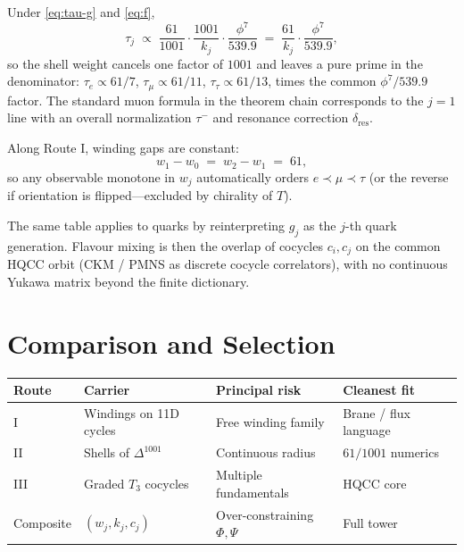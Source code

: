 \begin{corollary}
Under \eqref{eq:tau-g} and \eqref{eq:f},
\begin{equation}
\label{eq:tau-explicit}
\tau_j \;\propto\; \frac{61}{1001}\cdot\frac{1001}{k_j}\cdot\frac{\phi^7}{539.9}
\;=\; \frac{61}{k_j}\cdot\frac{\phi^7}{539.9},
\end{equation}
so the shell weight cancels one factor of \(1001\) and leaves a pure prime in the
denominator: \(\tau_e\propto 61/7\), \(\tau_\mu\propto 61/11\),
\(\tau_\tau\propto 61/13\), times the common \(\phi^7/539.9\) factor. The standard
muon formula in the theorem chain corresponds to the \(j=1\) line with an overall
normalization \(\tau^-\) and resonance correction \(\delta_{\mathrm{res}}\).
\end{corollary}

\begin{corollary}
Along Route I, winding gaps are constant:
\[
w_1-w_0 \;=\; w_2-w_1 \;=\; 61,
\]
so any observable monotone in \(w_j\) automatically orders
\(e\prec\mu\prec\tau\) (or the reverse if orientation is flipped---excluded by
chirality of \(T\)).
\end{corollary}

\begin{remark}
The same table applies to quarks by reinterpreting \(g_j\) as the \(j\)-th quark
generation. Flavour mixing is then the overlap of cocycles \(c_i,c_j\) on the
common HQCC orbit (CKM / PMNS as discrete cocycle correlators), with no
continuous Yukawa matrix beyond the finite dictionary.
\end{remark}

\section{Comparison and Selection}
\label{sec:compare}

\begin{center}
\begin{tabular}{@{}llll@{}}
\toprule
Route & Carrier & Principal risk & Cleanest fit \\
\midrule
I & Windings on 11D cycles & Free winding family & Brane / flux language \\
II & Shells of \(\Delta^{1001}\) & Continuous radius & \(61/1001\) numerics \\
III & Graded \(T_3\) cocycles & Multiple fundamentals & HQCC core \\
Composite & \((w_j,k_j,c_j)\) & Over-constraining \(\Phi,\Psi\) & Full tower \\
\bottomrule
\end{tabular}
\end{center}

